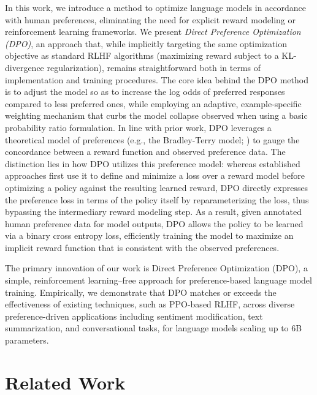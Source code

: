 In this work, we introduce a method to optimize language models in accordance with human preferences, eliminating the need for explicit reward modeling or reinforcement learning frameworks. We present \textit{{Direct Preference Optimization} (DPO)}, an approach that, while implicitly targeting the same optimization objective as standard RLHF algorithms (maximizing reward subject to a KL-divergence regularization), remains straightforward both in terms of implementation and training procedures. The core idea behind the DPO method is to adjust the model so as to increase the log odds of preferred responses compared to less preferred ones, while employing an adaptive, example-specific weighting mechanism that curbs the model collapse observed when using a basic probability ratio formulation. In line with prior work, DPO leverages a theoretical model of preferences (e.g., the Bradley-Terry model; \cite{bradley1952rankanalysis}) to gauge the concordance between a reward function and observed preference data. The distinction lies in how DPO utilizes this preference model: whereas established approaches first use it to define and minimize a loss over a reward model before optimizing a policy against the resulting learned reward, DPO directly expresses the preference loss in terms of the policy itself by reparameterizing the loss, thus bypassing the intermediary reward modeling step. As a result, given annotated human preference data for model outputs, DPO allows the policy to be learned via a binary cross entropy loss, efficiently training the model to maximize an implicit reward function that is consistent with the observed preferences.

The primary innovation of our work is Direct Preference Optimization (DPO), a simple, reinforcement learning–free approach for preference-based language model training. Empirically, we demonstrate that DPO matches or exceeds the effectiveness of existing techniques, such as PPO-based RLHF, across diverse preference-driven applications including sentiment modification, text summarization, and conversational tasks, for language models scaling up to 6B parameters.

\section{Related Work}

